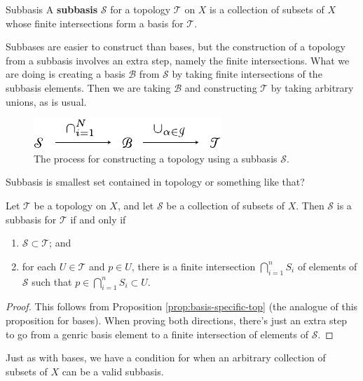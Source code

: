 \documentclass[10pt]{report}
\begin{document}
\begin{defn}{Subbasis}{}
	A \textbf{subbasis} $\mathcal{S}$ for a topology $\mathcal{T}$ on $X$ is a collection of subsets of $X$ whose finite intersections form a basis for $\mathcal{T}$.
\end{defn}

Subbases are easier to construct than bases, but the construction of a topology from a subbasis involves an extra step, namely the finite intersections. What we are doing is creating a basis $\mathcal{B}$ from $\mathcal{S}$ by taking finite intersections of the subbasis elements. Then we are taking $\mathcal{B}$ and constructing $\mathcal{T}$ by taking arbitrary unions, as is usual.

\begin{figure}[H]
	\centering
	\includegraphics[scale=1]{fig/subbasis-to-topology.pdf}
	\caption{The process for constructing a topology using a subbasis $\mathcal{S}$.}
\end{figure}

{\color{red}Subbasis is smallest set contained in topology or something like that?}

\begin{prop}
Let $\mathcal{T}$ be a topology on $X$, and let $\mathcal{S}$ be a collection of subsets of $X$. Then $\mathcal{S}$ is a subbasis for $\mathcal{T}$ if and only if
\begin{enumerate}
	\item $\mathcal{S} \subset \mathcal{T}$; and
	\item for each $U \in \mathcal{T}$ and $p \in U$, there is a finite intersection $\bigcap_{i=1}^n S_i$ of elements of $\mathcal{S}$ such that $p \in \bigcap_{i=1}^n S_i \subset U$.
\end{enumerate}
\end{prop}
\begin{proof}
	This follows from Proposition \ref{prop:basis-specific-top} (the analogue of this proposition for bases). When proving both directions, there's just an extra step to go from a genric basis element to a finite intersection of elements of $\mathcal{S}$.
\end{proof}

Just as with bases, we have a condition for when an arbitrary collection of subsets of $X$ can be a valid subbasis.
\end{document}
